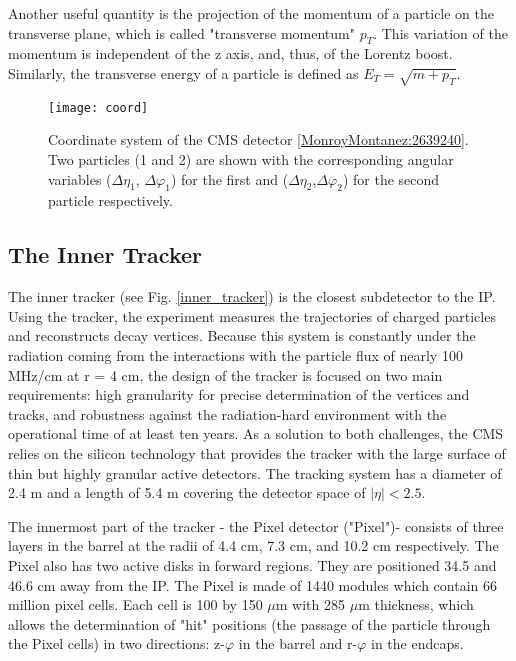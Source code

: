 \begin{normalsize}
Another useful quantity is the projection of the momentum of a particle on the transverse plane, which is called "transverse momentum" $p_T$. This variation of the momentum is independent of the z axis, and, thus, of the Lorentz boost.  Similarly, the transverse energy of a particle is defined as $E_T = \sqrt{m + p_T }$. 





\begin{figure}[H]
  \centering
  \texttt{[image: coord]}
  \caption[Coordinate system of the CMS detector]{Coordinate system of the CMS detector \ref{MonroyMontanez:2639240}. Two particles (1 and 2) are shown with the corresponding angular variables ($\Delta \eta_1$, $\Delta \varphi_1$) for the first and ($\Delta \eta_2$,$ \Delta \varphi_2$) for the second particle respectively.}
  \label{coord}
\end{figure}


\subsection{The Inner Tracker}

The inner tracker \cite{Tracker_phase2} (see Fig. \ref{inner_tracker}) is the closest subdetector to the IP. Using the tracker, the experiment measures the trajectories of charged particles and reconstructs decay vertices. Because this system is constantly under the radiation coming from the interactions with the particle flux of nearly 100 MHz/cm at r = 4 cm, the design of the tracker is focused on two main requirements: high granularity for precise determination of the vertices and tracks, and robustness against the radiation-hard environment with the operational time of at least ten years. As a solution to both challenges, the CMS relies on the silicon technology that provides the tracker with the large surface of thin but highly granular active detectors. The tracking system has a diameter of 2.4 m and a length of 5.4 m covering the detector space of $|\eta|< 2.5$. 

The innermost part of the tracker - the Pixel detector ("Pixel")- consists of three layers in the barrel at the radii of 4.4 cm, 7.3 cm, and 10.2 cm respectively. The Pixel also has two active disks in forward regions. They are positioned 34.5 and 46.6 cm away from the IP. The Pixel is made of 1440 modules which contain 66 million pixel cells. Each cell is 100 by 150 $\mu$m with 285 $\mu$m thickness, which allows the determination of "hit" positions (the passage of the particle through the Pixel cells) in two directions: z-$\varphi$ in the barrel and r-$\varphi$ in the endcaps.


\end{normalsize}
